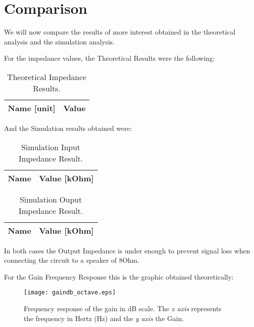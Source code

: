 \newpage
\section{Comparison}
\label{sec:comparison}
\par
We will now compare the results of more interest obtained in the theoretical analysis and the simulation analysis.\par


For the impedance values, the Theoretical Results were the following:

\begin{table}[H]
	\centering
	\begin{tabular}{|l|r|}
		\hline    
		{\bf Name [unit]} & {\bf Value} \\ \hline
		
	\end{tabular}
	\caption{Theoretical Impedance Results.}
	\label{tab:teo}
\end{table}

And the Simulation results obtained were:

\begin{table}[H]
	\centering
	\begin{tabular}{|l|r|}
		\hline    
		{\bf Name} & {\bf Value [kOhm]} \\ \hline
		
	\end{tabular}
	\caption{Simulation Input Impedance Result.}
	\label{tab:op_sim1}
\end{table}
 
\begin{table}[H]
	\centering
	\begin{tabular}{|l|r|}
		\hline    
		{\bf Name} & {\bf Value [kOhm]} \\ \hline
		
	\end{tabular}
	\caption{Simulation Ouput Impedance Result.}
	\label{tab:op_sim1}
\end{table}

In both cases the Output Impedance is under enough to prevent signal loss when connecting the circuit to a speaker of 8Ohm.


For the Gain Frequency Response this is the graphic obtained theoretically:

\begin{figure}[H] \centering
	\texttt{[image: gaindb\_octave.eps]}
	\caption {Frequency response of the gain in dB scale. The \textit{x axis} represents the frequency in Hertz (Hz) and the \textit{y axis} the Gain.}
	\label{fig:teo_gaindB}
\end{figure}


